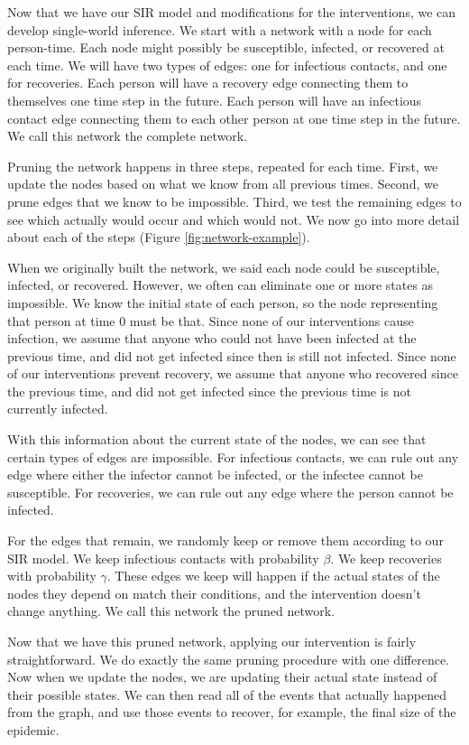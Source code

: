 \documentclass[openacc]{rsproca_new}%
\begin{document}
Now that we have our SIR model and modifications for the interventions, we can develop single-world inference.
We start with a network with a node for each person-time.
Each node might possibly be susceptible, infected, or recovered at each time.
We will have two types of edges: one for infectious contacts, and one for recoveries.
Each person will have a recovery edge connecting them to themselves one time step in the future.
Each person will have an infectious contact edge connecting them to each other person at one time step in the future.
We call this network the complete network.

Pruning the network happens in three steps, repeated for each time.
First, we update the nodes based on what we know from all previous times.
Second, we prune edges that we know to be impossible.
Third, we test the remaining edges to see which actually would occur and which would not.
We now go into more detail about each of the steps (Figure \ref{fig:network-example}).

When we originally built the network, we said each node could be susceptible, infected, or recovered.
However, we often can eliminate one or more states as impossible.
We know the initial state of each person, so the node representing that person at time $0$ must be that.
Since none of our interventions cause infection, we assume that anyone who could not have been infected at the previous time, and did not get infected since then is still not infected.
Since none of our interventions prevent recovery, we assume that anyone who recovered since the previous time, and did not get infected since the previous time is not currently infected.

With this information about the current state of the nodes, we can see that certain types of edges are impossible.
For infectious contacts, we can rule out any edge where either the infector cannot be infected, or the infectee cannot be susceptible.
For recoveries, we can rule out any edge where the person cannot be infected.

For the edges that remain, we randomly keep or remove them according to our SIR model.
We keep infectious contacts with probability $\beta$.
We keep recoveries with probability $\gamma$.
These edges we keep will happen if the actual states of the nodes they depend on match their conditions, and the intervention doesn't change anything.
We call this network the pruned network.

Now that we have this pruned network, applying our intervention is fairly straightforward.
We do exactly the same pruning procedure with one difference.
Now when we update the nodes, we are updating their actual state instead of their possible states.
We can then read all of the events that actually happened from the graph, and use those events to recover, for example, the final size of the epidemic.
\end{document}
